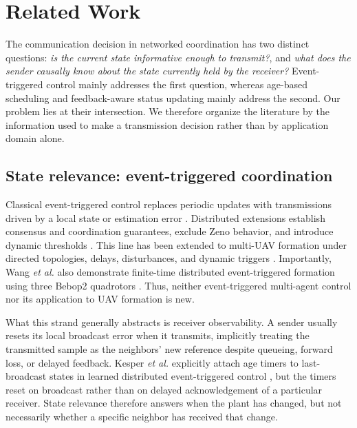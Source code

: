 \section{Related Work}
\label{sec:related-v2}

The communication decision in networked coordination has two distinct
questions: \emph{is the current state informative enough to transmit?}, and
\emph{what does the sender causally know about the state currently held by the
receiver?} Event-triggered control mainly addresses the first question,
whereas age-based scheduling and feedback-aware status updating mainly address
the second. Our problem lies at their intersection. We therefore organize the
literature by the information used to make a transmission decision rather
than by application domain alone.

\subsection{State relevance: event-triggered coordination}

Classical event-triggered control replaces periodic updates with transmissions
driven by a local state or estimation error
\cite{astrom2002riemann,tabuada2007event,heemels2012introduction}. Distributed
extensions establish consensus and coordination guarantees, exclude Zeno
behavior, and introduce dynamic thresholds
\cite{dimarogonas2012distributed,seyboth2013eventbased,girard2015dynamic,yi2017distributed,nowzari2019eventtriggered}.
This line has been extended to multi-UAV formation under directed topologies,
delays, disturbances, and dynamic triggers
\cite{yin2023eventbased,ji2023dynamic,chen2024distributed,yang2025fencing}.
Importantly, Wang \emph{et al.} also demonstrate finite-time distributed
event-triggered formation using three Bebop2 quadrotors
\cite{wang2022finiteuav}. Thus, neither event-triggered multi-agent control nor
its application to UAV formation is new.

What this strand generally abstracts is receiver observability. A sender
usually resets its local broadcast error when it transmits, implicitly treating
the transmitted sample as the neighbors' new reference despite queueing,
forward loss, or delayed feedback. Kesper \emph{et al.} explicitly attach age
timers to last-broadcast states in learned distributed event-triggered control
\cite{kesper2023toward}, but the timers reset on broadcast rather than on
delayed acknowledgement of a particular receiver. State relevance therefore
answers when the plant has changed, but not necessarily whether a specific
neighbor has received that change.

